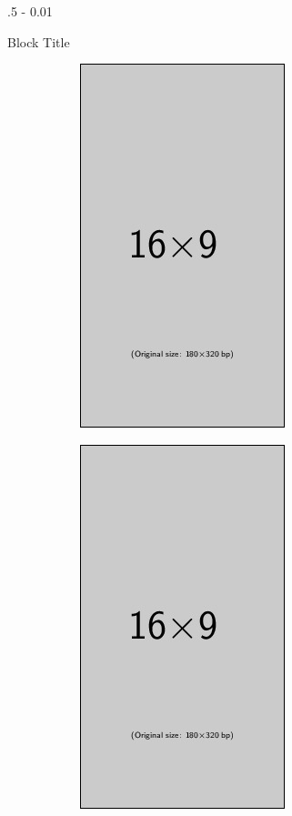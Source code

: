\documentclass{postertheme}\usepackage[]{graphicx}\usepackage[]{color}
\begin{document}
\begin{frame}
\begin{columns}[onlytextwidth]
\begin{column}{.5 \textwidth - 0.01 \textwidth}
\begin{block}{Block Title}
\begin{figure}
        \begin{minipage}{0.2 \linewidth}
          \begin{figure}
            \includegraphics[scale=1]{figures/example-image-9x16.jpg}
          \end{figure}
        \end{minipage}
        \hskip0.45in
        \begin{minipage}{0.2 \linewidth}
          \begin{figure}
            \includegraphics[scale=1]{figures/example-image-9x16.jpg}
          \end{figure}

\end{minipage}
\end{figure}
\end{block}
\end{column}
\end{columns}
\end{frame}
\end{document}
